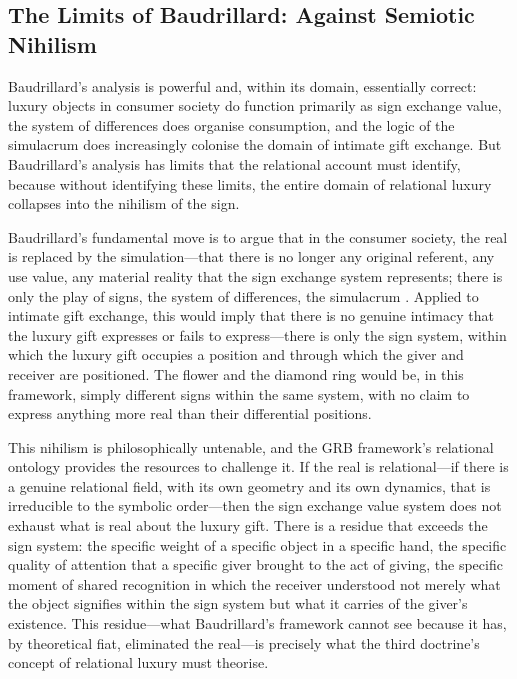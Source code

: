 \subsection{The Limits of Baudrillard: Against Semiotic Nihilism}
\label{p16:subsec:limits}

\noindent
Baudrillard's analysis is powerful and, within its domain, essentially correct: luxury objects in consumer society do function primarily as sign exchange value, the system of differences does organise consumption, and the logic of the simulacrum does increasingly colonise the domain of intimate gift exchange. But Baudrillard's analysis has limits that the relational account must identify, because without identifying these limits, the entire domain of relational luxury collapses into the nihilism of the sign.

Baudrillard's fundamental move is to argue that in the consumer society, the real is replaced by the simulation---that there is no longer any original referent, any use value, any material reality that the sign exchange system represents; there is only the play of signs, the system of differences, the simulacrum \parencite{baudrillard1981}. Applied to intimate gift exchange, this would imply that there is no genuine intimacy that the luxury gift expresses or fails to express---there is only the sign system, within which the luxury gift occupies a position and through which the giver and receiver are positioned. The flower and the diamond ring would be, in this framework, simply different signs within the same system, with no claim to express anything more real than their differential positions.

This nihilism is philosophically untenable, and the GRB framework's relational ontology provides the resources to challenge it. If the real is relational---if there is a genuine relational field, with its own geometry and its own dynamics, that is irreducible to the symbolic order---then the sign exchange value system does not exhaust what is real about the luxury gift. There is a residue that exceeds the sign system: the specific weight of a specific object in a specific hand, the specific quality of attention that a specific giver brought to the act of giving, the specific moment of shared recognition in which the receiver understood not merely what the object signifies within the sign system but what it carries of the giver's existence. This residue---what Baudrillard's framework cannot see because it has, by theoretical fiat, eliminated the real---is precisely what the third doctrine's concept of relational luxury must theorise.

